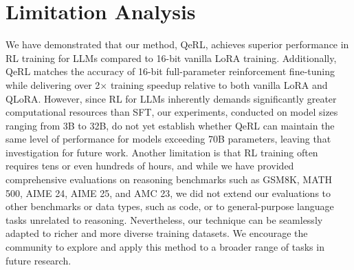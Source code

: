 \section{Limitation Analysis}

We have demonstrated that our method, QeRL, achieves superior performance in RL training for LLMs compared to 16-bit vanilla LoRA training. Additionally, QeRL matches the accuracy of 16-bit full-parameter reinforcement fine-tuning while delivering over 2$\times$ training speedup relative to both vanilla LoRA and QLoRA. However, since RL for LLMs inherently demands significantly greater computational resources than SFT, our experiments, conducted on model sizes ranging from 3B to 32B, do not yet establish whether QeRL can maintain the same level of performance for models exceeding 70B parameters, leaving that investigation for future work. Another limitation is that RL training often requires tens or even hundreds of hours, and while we have provided comprehensive evaluations on reasoning benchmarks such as GSM8K, MATH 500, AIME 24, AIME 25, and AMC 23, we did not extend our evaluations to other benchmarks or data types, such as code, or to general-purpose language tasks unrelated to reasoning. Nevertheless, our technique can be seamlessly adapted to richer and more diverse training datasets. We encourage the community to explore and apply this method to a broader range of tasks in future research.


